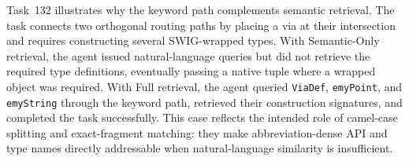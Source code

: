 
Task~132 illustrates why the keyword path complements semantic retrieval. The task connects two orthogonal routing paths by placing a via at their intersection and requires constructing several SWIG-wrapped types. With Semantic-Only retrieval, the agent issued natural-language queries but did not retrieve the required type definitions, eventually passing a native tuple where a wrapped object was required. With Full retrieval, the agent queried \texttt{ViaDef}, \texttt{emyPoint}, and \texttt{emyString} through the keyword path, retrieved their construction signatures, and completed the task successfully. This case reflects the intended role of camel-case splitting and exact-fragment matching: they make abbreviation-dense API and type names directly addressable when natural-language similarity is insufficient.

